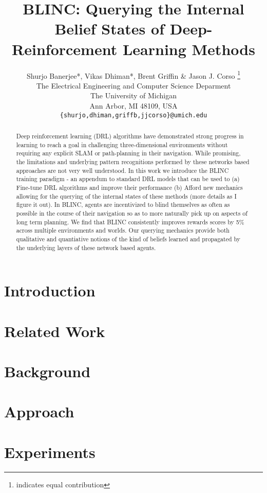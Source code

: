 \documentclass{article} %
\title{BLINC: Querying the Internal Belief States of Deep-Reinforcement Learning Methods}
\author{Shurjo Banerjee*, Vikas Dhiman*, Brent Griffin \& Jason J. Corso \thanks{indicates equal contribution} \\
The Electrical Engineering and Computer Science Deparment\\
The University of Michigan\\
Ann Arbor, MI 48109, USA \\
\texttt{\{shurjo,dhiman,griffb,jjcorso\}@umich.edu} \\
}
\begin{document}
\maketitle

\begin{abstract}
    Deep reinforcement learning (DRL) algorithms have demonstrated strong progress in learning to reach a goal in challenging three-dimensional environments without requiring any explicit SLAM or path-planning in their navigation. While promising, the limitations and underlying pattern recognitions performed by these networks based approaches are not very well understood. In this work we introduce the BLINC training paradigm - an appendum to standard DRL models that can be used to (a) Fine-tune DRL algorithms and improve their performance (b) Afford new mechanics allowing for the querying of the internal states of these methods (more details as I figure it out). In BLINC, agents are incentivized to blind themselves as often as possible in the course of their navigation so as to more naturally pick up on aspects of long term planning. We find that BLINC consistently improves rewards scores by 5\% across multiple environments and worlds. Our querying mechanics provide both qualitative and quantiative notions of the kind of beliefs learned and propagated by the underlying layers of these network based agents. 
\end{abstract}

\section{Introduction}


\section{Related Work}


\section{Background}


\section{Approach}


\section{Experiments}

\end{document}
